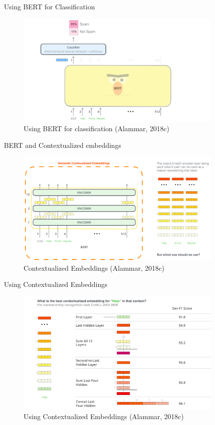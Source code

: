 \documentclass[10pt]{beamer}
\begin{document}
\begin{frame}{Using BERT for Classification}

\begin{figure}[h]
\centering
\includegraphics[width=0.9\textwidth]{fig/bert-classifier.png}
\caption{Using BERT for classification (Alammar, 2018c)}
\end{figure}

\end{frame}

\begin{frame}{BERT and Contextualized embeddings}

\begin{figure}[h]
\centering
\includegraphics[width=0.9\textwidth]{fig/bert-contexualized-embeddings.png}
\caption{Contextualized Embeddings (Alammar, 2018c)}
\end{figure}

\end{frame}

\begin{frame}{Using Contextualized Embeddings}

\begin{figure}[h]
\centering
\includegraphics[width=0.9\textwidth]{fig/bert-feature-extraction-contextualized-embeddings.png}
\caption{Using Contextualized Embeddings (Alammar, 2018c)}
\end{figure}

\end{frame}
\end{document}
